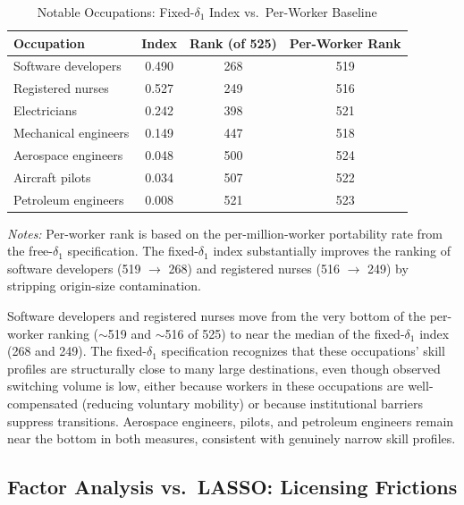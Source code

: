 \documentclass[12pt]{article}
\begin{document}
\begin{table}[H]
\centering
\caption{Notable Occupations: Fixed-$\delta_1$ Index vs.\ Per-Worker Baseline}
\label{tab:notable}
\begin{tabular}{lccc}
\toprule
\textbf{Occupation} & \textbf{Index} & \textbf{Rank (of 525)} & \textbf{Per-Worker Rank} \\
\midrule
Software developers          & 0.490 & 268 & 519 \\
Registered nurses             & 0.527 & 249 & 516 \\
Electricians                  & 0.242 & 398 & 521 \\
Mechanical engineers          & 0.149 & 447 & 518 \\
Aerospace engineers           & 0.048 & 500 & 524 \\
Aircraft pilots               & 0.034 & 507 & 522 \\
Petroleum engineers           & 0.008 & 521 & 523 \\
\bottomrule
\end{tabular}
\begin{minipage}{0.9\textwidth}
\vspace{0.5em}
\footnotesize \textit{Notes:} Per-worker rank is based on the per-million-worker portability rate from the free-$\delta_1$ specification. The fixed-$\delta_1$ index substantially improves the ranking of software developers (519 $\to$ 268) and registered nurses (516 $\to$ 249) by stripping origin-size contamination.
\end{minipage}
\end{table}

Software developers and registered nurses move from the very bottom of the per-worker ranking ($\sim$519 and $\sim$516 of 525) to near the median of the fixed-$\delta_1$ index (268 and 249). The fixed-$\delta_1$ specification recognizes that these occupations' skill profiles are structurally close to many large destinations, even though observed switching volume is low, either because workers in these occupations are well-compensated (reducing voluntary mobility) or because institutional barriers suppress transitions. Aerospace engineers, pilots, and petroleum engineers remain near the bottom in both measures, consistent with genuinely narrow skill profiles.

\subsection{Factor Analysis vs.\ LASSO: Licensing Frictions}
\label{sec:results_factor}
\end{document}
